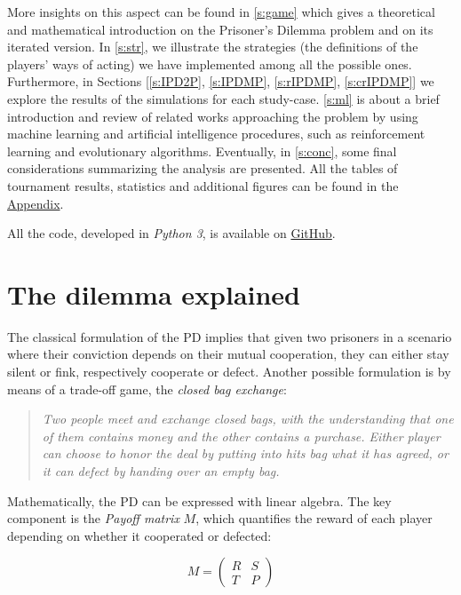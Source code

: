 \documentclass[journal,10pt,twoside]{IEEEtran}
\begin{document}
More insights on this aspect can be found in \autoref{s:game} which gives a theoretical and mathematical introduction on the Prisoner's Dilemma problem and on its iterated version.
In \autoref{s:str}, we illustrate the strategies (the definitions of the players' ways of acting) we have implemented among all the possible ones.
Furthermore, in Sections [\ref{s:IPD2P}, \ref{s:IPDMP}, \ref{s:rIPDMP}, \ref{s:crIPDMP}] we explore the results of the simulations for each study-case.
\autoref{s:ml} is about a brief introduction and review of related works approaching the problem by using machine learning and artificial intelligence procedures, such as reinforcement learning and evolutionary algorithms.
Eventually, in \autoref{s:conc}, some final considerations summarizing the analysis are presented.
All the tables of tournament results, statistics and additional figures can be found in the \hyperref[s:appendix]{Appendix}.

All the code, developed in \textit{Python 3}, is available on \href{https://github.com/eliabntt/LaboratoryOfComputationalPhysics/tree/Group9}{GitHub}.

\section{The dilemma explained} \label{s:game}
The classical formulation of the PD implies that given two prisoners in a scenario where their conviction depends on their mutual cooperation, they can either stay silent or fink, respectively cooperate or defect.
Another possible formulation is by means of a trade-off game, the \textit{closed bag exchange}:

\begin{quote}
\textit{Two people meet and exchange closed bags, with the understanding that one of them contains money and the other contains a purchase. Either player can choose to honor the deal by putting into hits bag what it has agreed, or it can defect by handing over an empty bag.}
\end{quote}

Mathematically, the PD can be expressed with linear algebra. The key component is the \textit{Payoff matrix} $M$, which quantifies the reward of each player depending on whether it cooperated or defected:

$$
M = 
\begin{pmatrix} 
R & S \\
T & P 
\end{pmatrix}
$$
\end{document}
